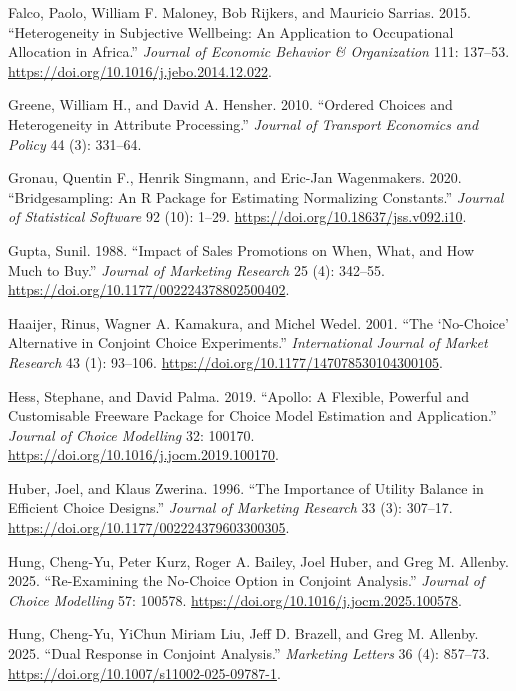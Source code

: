 \documentclass[
  letterpaper,
  DIV=11,
  numbers=noendperiod]{scrartcl}
\newlength{\cslhangindent}
\newenvironment{CSLReferences}[2] %
 {\begin{list}{}{%
  \setlength{\itemindent}{0pt}
  \setlength{\leftmargin}{0pt}
  \setlength{\parsep}{0pt}
  \ifodd #1
   \setlength{\leftmargin}{\cslhangindent}
   \setlength{\itemindent}{-1\cslhangindent}
  \fi
  \setlength{\itemsep}{#2\baselineskip}}}
 {\end{list}}
\theoremstyle{plain}
\theoremstyle{plain}
\theoremstyle{remark}
\begin{document}
\begin{CSLReferences}{1}{1}
Falco, Paolo, William F. Maloney, Bob Rijkers, and Mauricio Sarrias.
2015. {``Heterogeneity in Subjective Wellbeing: An Application to
Occupational Allocation in {Africa}.''} \emph{Journal of Economic
Behavior \& Organization} 111: 137--53.
\url{https://doi.org/10.1016/j.jebo.2014.12.022}.

Greene, William H., and David A. Hensher. 2010. {``Ordered Choices and
Heterogeneity in Attribute Processing.''} \emph{Journal of Transport
Economics and Policy} 44 (3): 331--64.

Gronau, Quentin F., Henrik Singmann, and Eric-Jan Wagenmakers. 2020.
{``Bridgesampling: An {R} Package for Estimating Normalizing
Constants.''} \emph{Journal of Statistical Software} 92 (10): 1--29.
\url{https://doi.org/10.18637/jss.v092.i10}.

Gupta, Sunil. 1988. {``Impact of Sales Promotions on When, What, and How
Much to Buy.''} \emph{Journal of Marketing Research} 25 (4): 342--55.
\url{https://doi.org/10.1177/002224378802500402}.

Haaijer, Rinus, Wagner A. Kamakura, and Michel Wedel. 2001. {``The
{`No-Choice'} Alternative in Conjoint Choice Experiments.''}
\emph{International Journal of Market Research} 43 (1): 93--106.
\url{https://doi.org/10.1177/147078530104300105}.

Hess, Stephane, and David Palma. 2019. {``Apollo: A Flexible, Powerful
and Customisable Freeware Package for Choice Model Estimation and
Application.''} \emph{Journal of Choice Modelling} 32: 100170.
\url{https://doi.org/10.1016/j.jocm.2019.100170}.

Huber, Joel, and Klaus Zwerina. 1996. {``The Importance of Utility
Balance in Efficient Choice Designs.''} \emph{Journal of Marketing
Research} 33 (3): 307--17.
\url{https://doi.org/10.1177/002224379603300305}.

Hung, Cheng-Yu, Peter Kurz, Roger A. Bailey, Joel Huber, and Greg M.
Allenby. 2025. {``Re-Examining the No-Choice Option in Conjoint
Analysis.''} \emph{Journal of Choice Modelling} 57: 100578.
\url{https://doi.org/10.1016/j.jocm.2025.100578}.

Hung, Cheng-Yu, YiChun Miriam Liu, Jeff D. Brazell, and Greg M. Allenby.
2025. {``Dual Response in Conjoint Analysis.''} \emph{Marketing Letters}
36 (4): 857--73. \url{https://doi.org/10.1007/s11002-025-09787-1}.


\end{CSLReferences}
\end{document}
